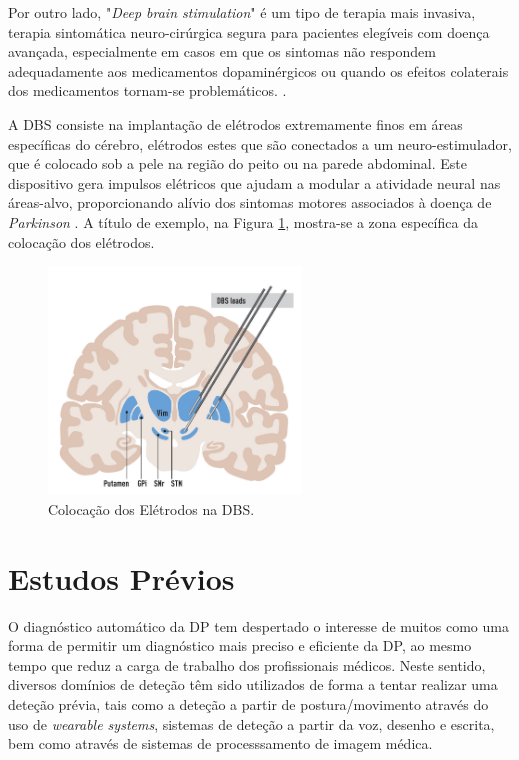 \documentclass[12pt,a4paper,twoside]{report}
\begin{document}
{Por outro lado, "\textit{Deep brain stimulation}" é um tipo de terapia mais invasiva, terapia sintomática neuro-cirúrgica segura para pacientes elegíveis com doença avançada, especialmente em casos em que os sintomas não respondem adequadamente aos medicamentos dopaminérgicos ou quando os efeitos colaterais dos medicamentos tornam-se problemáticos. \cite{https://doi.org/10.1111/joim.13541}.

A \gls{DBS} consiste na implantação de elétrodos extremamente finos em áreas específicas do cérebro, elétrodos estes que são conectados a um neuro-estimulador, que é colocado sob a pele na região do peito ou na parede abdominal. Este dispositivo gera impulsos elétricos que ajudam a modular a atividade neural nas áreas-alvo, proporcionando alívio dos sintomas motores associados à doença de \textit{Parkinson} \cite{https://doi.org/10.1111/joim.13541}. A título de exemplo, na Figura \ref{fig:dbs}, mostra-se a zona específica da colocação dos elétrodos.

\begin{figure}[H]
    \centering
    \includegraphics[width=0.6\textwidth]{imagens/DeepBrainStimulation.png}
    \caption{Colocação dos Elétrodos na \gls{DBS}.}
    \label{fig:dbs}
\end{figure}


\section{Estudos Prévios}

O diagnóstico automático da \gls{DP} tem despertado o interesse de muitos como uma forma de permitir um diagnóstico mais preciso e eficiente da \gls{DP}, ao mesmo tempo que reduz a carga de trabalho dos profissionais médicos. Neste sentido, diversos domínios de deteção têm sido utilizados de forma a tentar realizar uma deteção prévia, tais como a deteção a partir de postura/movimento através do uso de \textit{wearable systems}, sistemas de deteção a partir da voz, desenho e escrita, bem como através de sistemas de processsamento de imagem médica.

}
\end{document}
